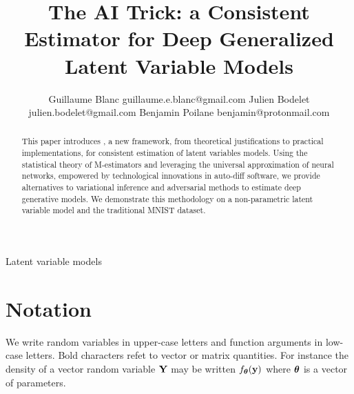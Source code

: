 \documentclass[twoside,11pt]{article}
\newcommand{\gb}[2][]{\todo[color=gbcolor, caption={GB}, #1]{#2}}
\begin{document}
\title{The AI Trick: a Consistent Estimator for Deep Generalized Latent Variable Models}

\author{\name Guillaume Blanc \email guillaume.e.blanc@gmail.com
  \AND
  \name Julien Bodelet \email julien.bodelet@gmail.com
  \AND
  \name Benjamin Poilane \email benjamin@protonmail.com
}


\maketitle

\begin{abstract}%
This paper introduces \gb[]{find good name}, a new framework, from theoretical justifications to practical implementations, for consistent estimation of latent variables models. Using the statistical theory of M-estimators and leveraging the universal approximation of neural networks, empowered by technological innovations in auto-diff software, we provide alternatives to variational inference and adversarial methods to estimate deep generative models. We demonstrate this methodology on a non-parametric latent variable model and the traditional MNIST dataset.
\end{abstract}

\begin{keywords}
Latent variable models
\end{keywords}


\listoftodos

\newpage
\section{Notation}
We write random variables in upper-case letters and function arguments in low-case letters. Bold characters refet to vector or matrix quantities. For instance the density of a vector random variable ${\bf Y}$ may be written $f_{\bm{\theta}}({\bf y})$ where ${\bm{\theta}}$ is  a vector of parameters.
\end{document}
